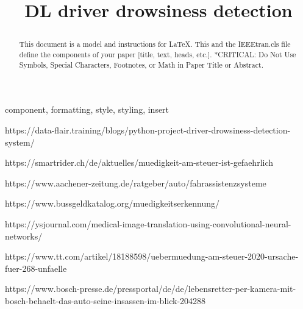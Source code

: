 \documentclass[conference]{IEEEtran}
\begin{document}
\lstset{frame=lines}
\lstset{basicstyle=\footnotesize}


\title{DL driver drowsiness detection\\
{\footnotesize \textsuperscript{}}

}

\author{
}

\maketitle

\begin{abstract}
This document is a model and instructions for \LaTeX.
This and the IEEEtran.cls file define the components of your paper [title, text, heads, etc.]. *CRITICAL: Do Not Use Symbols, Special Characters, Footnotes, 
or Math in Paper Title or Abstract.
\end{abstract}

\begin{IEEEkeywords}
component, formatting, style, styling, insert
\end{IEEEkeywords}








\newpage




\begin{thebibliography}{00}

 https://data-flair.training/blogs/python-project-driver-drowsiness-detection-system/

 https://smartrider.ch/de/aktuelles/muedigkeit-am-steuer-ist-gefaehrlich

 https://www.aachener-zeitung.de/ratgeber/auto/fahrassistenzsysteme

 https://www.bussgeldkatalog.org/muedigkeitserkennung/

 https://ysjournal.com/medical-image-translation-using-convolutional-neural-networks/

 https://www.tt.com/artikel/18188598/uebermuedung-am-steuer-2020-ursache-fuer-268-unfaelle

 https://www.bosch-presse.de/pressportal/de/de/lebensretter-per-kamera-mit-bosch-behaelt-das-auto-seine-insassen-im-blick-204288


\end{thebibliography}
\vspace{12pt}
\end{document}
